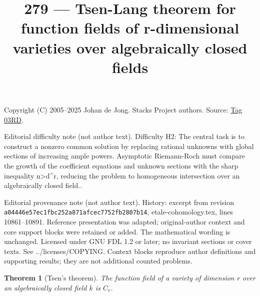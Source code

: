 \documentclass{amsart}
\theoremstyle{plain}
\newtheorem{theorem}[subsection]{Theorem}
\theoremstyle{definition}
\theoremstyle{remark}
\numberwithin{equation}{subsection}
\begin{document}
\title[Stacks Project, Tag 03RD]{279 --- Tsen-Lang theorem for function fields of r-dimensional varieties over algebraically closed fields}
\maketitle
\noindent Copyright (C) 2005--2025 Johan de Jong. Stacks Project authors. Source: \href{https://stacks.math.columbia.edu/tag/03RD}{Tag 03RD}.

\noindent Editorial difficulty note (not author text). Difficulty H2: The central task is to construct a nonzero common solution by replacing rational unknowns with global sections of increasing ample powers. Asymptotic Riemann-Roch must compare the growth of the coefficient equations and unknown sections with the sharp inequality n>d\textasciicircum{}r, reducing the problem to homogeneous intersection over an algebraically closed field..

\noindent Editorial provenance note (not author text). History: excerpt from revision \texttt{a0444\allowbreak 6e57e\allowbreak c1fbc\allowbreak 252a8\allowbreak 71afc\allowbreak ec775\allowbreak 2fb28\allowbreak 07b14}, etale-cohomology.tex, lines 10861--10891. Reference presentation was adapted; original-author context and core support blocks were retained or added. The mathematical wording is unchanged. Licensed under GNU FDL 1.2 or later; no invariant sections or cover texts. See ../licenses/COPYING. Context blocks reproduce author definitions and supporting results; they are not additional counted problems.

\begin{theorem}[Tsen's theorem]
\label{theorem-tsen}
The function field of a variety of dimension $r$ over an algebraically closed
field $k$ is $C_r$.
\end{theorem}
\end{document}
